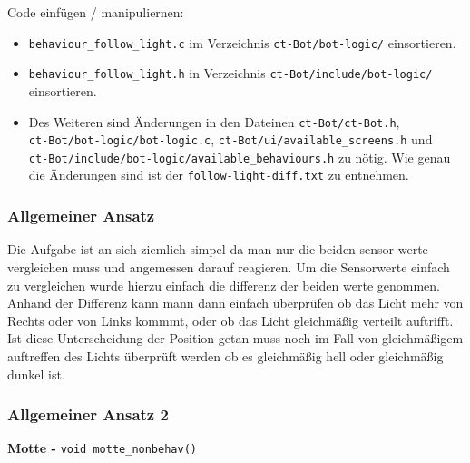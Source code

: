 Code einfügen / manipuliernen:
\begin{itemize}
    \item \verb+behaviour_follow_light.c+  im Verzeichnis 
        \verb+ct-Bot/bot-logic/+ einsortieren.
    \item \verb+behaviour_follow_light.h+ in Verzeichnis
        \verb+ct-Bot/include/bot-logic/+ einsortieren.
    \item Des Weiteren sind Änderungen in den Dateinen \verb+ct-Bot/ct-Bot.h+, \\
        \verb+ct-Bot/bot-logic/bot-logic.c+,
        \verb+ct-Bot/ui/available_screens.h+ und \\
        \verb+ct-Bot/include/bot-logic/available_behaviours.h+ zu nötig.
        Wie genau die Änderungen sind ist der \verb+follow-light-diff.txt+ zu entnehmen.
\end{itemize}

\subsubsection{Allgemeiner Ansatz}

Die Aufgabe ist an sich ziemlich simpel da man nur die beiden sensor werte vergleichen muss und angemessen darauf reagieren.
Um die Sensorwerte einfach zu vergleichen wurde hierzu einfach die differenz der beiden werte genommen.
Anhand der Differenz kann mann dann einfach überprüfen ob das Licht mehr von Rechts oder von Links kommmt, oder ob das Licht gleichmäßig verteilt auftrifft.
Ist diese Unterscheidung der Position getan muss noch im Fall von gleichmäßigem auftreffen des Lichts überprüft werden ob es gleichmäßig hell oder gleichmäßig dunkel ist.



\subsubsection{Allgemeiner Ansatz 2 }

\textbf{Motte - }\verb+void motte_nonbehav()+\\

